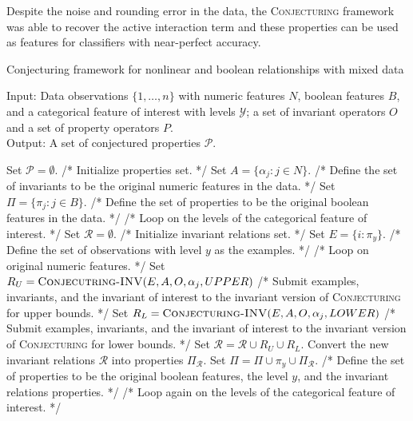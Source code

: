 \documentclass[ijds,nonblindrev]{informs-ijds}
\begin{document}
Despite the noise and rounding error in the data, the \textsc{Conjecturing} framework was able to recover the active interaction term and these properties can be used as features for classifiers with near-perfect accuracy.


\begin{algorithm}
\caption{\label{classFramework}Conjecturing framework for nonlinear and boolean relationships with mixed data}

Input: Data observations $\{1,\ldots, n\}$ with numeric features $N$, boolean features $B$, and a categorical feature of interest with levels $\mathcal{Y}$; a set of invariant operators $O$ and a set of property operators $P$.\\
Output: A set of conjectured properties $\mathcal{P}$.
\begin{algorithmic}[1]
\State Set $\mathcal{P} = \emptyset$.  \hfill /* Initialize properties set. */
\State Set $A = \{\alpha_j: j \in N \}$. \hfill /* Define the set of invariants to be the original numeric features in the data. */ \label{invariants}
\State Set $\Pi = \{\pi_j: j \in B \}$. \hfill /* Define the set of properties to be the original boolean features in the data. */ \label{properties}
 \hfill /* Loop on the levels of the categorical feature of interest. */  \label{loop1}
  \State Set $\mathcal{R} = \emptyset$. \hfill /* Initialize invariant relations set. */
  \State Set $E = \{i: \pi_y\}$.  \hfill /* Define the set of observations with level $y$ as the examples. */ \label{examples}
   \hfill /* Loop on original  numeric features. */ 
    \State Set $R_U = \mbox{\textsc{Conjecutring-INV}}(E, A, O, \alpha_{j}, UPPER)$  \hfill /* Submit examples, invariants, and the invariant of interest to the invariant version of \textsc{Conjecturing} for upper bounds. */ \label{upper}
    \State Set $R_L = \mbox{\textsc{Conjecturing-INV}}(E, A, O, \alpha_{j}, LOWER)$  \hfill /* Submit examples, invariants, and the invariant of interest to the invariant version of \textsc{Conjecturing} for lower bounds. */ \label{lower}
    \State Set $\mathcal{R} = \mathcal{R} \cup R_U \cup R_L$. \label{combineRelations}
  \EndFor 
  \State Convert the new invariant relations $\mathcal{R}$ into properties $\Pi_\mathcal{R}$. \label{convert}
  \State Set $\Pi = \Pi \cup \pi_y \cup \Pi_\mathcal{R}$. \hfill  /* Define the set of properties to be the original boolean features, the level $y$, and the invariant relations properties. */  \label{combine}
  \EndFor \label{endloop1}
 \hfill /* Loop again on the levels of the categorical feature of interest. */  \label{loop2}

\end{algorithmic}
\end{algorithm}
\end{document}
